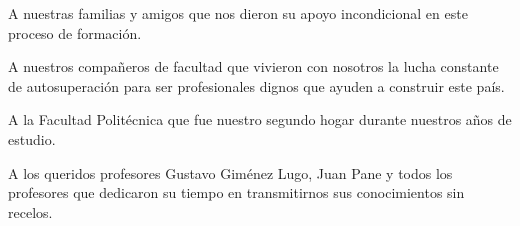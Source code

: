 \begin{thankspage} 
A nuestras familias y amigos que nos dieron su apoyo incondicional en este proceso de formación.

A nuestros compañeros de facultad que vivieron con nosotros la lucha constante de autosuperación para ser profesionales dignos que ayuden a construir este país.

A la Facultad Politécnica que fue nuestro segundo hogar durante nuestros años de estudio.

A los queridos profesores Gustavo Giménez Lugo, Juan Pane y todos los profesores que dedicaron su tiempo en transmitirnos sus conocimientos sin recelos.

\end{thankspage}